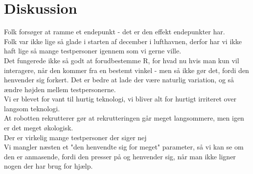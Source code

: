\chapter{Diskussion}
\label{TestAfSkalaDiskussion}
Folk forsøger at ramme et endepunkt - det er den effekt endepunkter har.\\
Folk var ikke lige så glade i starten af december i lufthavnen, derfor har vi ikke haft lige så mange testpersoner igennem som vi gerne ville.\\
Det fungerede ikke så godt at forudbestemme R, for hvad nu hvis man kun vil interagere, når den kommer fra en bestemt vinkel - men så ikke gør det, fordi den henvender sig forkert. Det er bedre at lade der være naturlig variation, og så ændre højden mellem testpersonerne.\\
Vi er blevet for vant til hurtig teknologi, vi bliver alt for hurtigt irriteret over langsom teknologi.\\
At robotten rekrutterer gør at rekrutteringen går meget langsommere, men igen er det meget økologisk.\\
Der er virkelig mange testpersoner der siger nej\\
Vi mangler næsten et "den henvendte sig for meget" parameter, så vi kan se om den er anmasende, fordi den presser på og henvender sig, når man ikke ligner nogen der har brug for hjælp.\\
